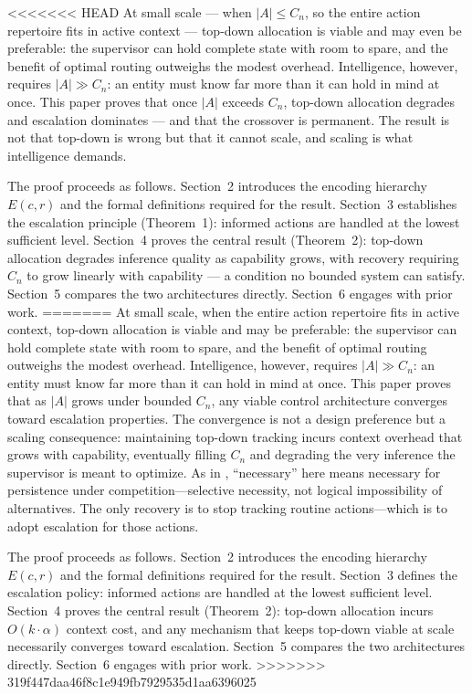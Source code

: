 \documentclass[11pt]{article}
\theoremstyle{definition}
\begin{document}
<<<<<<< HEAD
At small scale --- when $|A| \leq C_n$, so the entire action repertoire
fits in active context --- top-down allocation is viable and may even be
preferable: the supervisor can hold complete state with room to spare,
and the benefit of optimal routing outweighs the modest overhead.
Intelligence, however, requires $|A| \gg C_n$: an entity must know far
more than it can hold in mind at once. This paper proves that once
$|A|$ exceeds $C_n$, top-down allocation degrades and escalation
dominates --- and that the crossover is permanent. The result is not
that top-down is wrong but that it cannot scale, and scaling is what
intelligence demands.

The proof proceeds as follows. Section~2 introduces the encoding
hierarchy $E(c,r)$ and the formal definitions required for the result.
Section~3 establishes the escalation principle (Theorem~1): informed
actions are handled at the lowest sufficient level. Section~4 proves
the central result (Theorem~2): top-down allocation degrades inference
quality as capability grows, with recovery requiring $C_n$ to grow
linearly with capability --- a condition no bounded system can satisfy.
Section~5 compares the two architectures directly. Section~6 engages
with prior work.
=======
At small scale, when the entire action repertoire fits in active
context, top-down allocation is viable and may be preferable: the
supervisor can hold complete state with room to spare, and the benefit
of optimal routing outweighs the modest overhead. Intelligence,
however, requires $|A| \gg C_n$: an entity must know far more than it
can hold in mind at once. This paper proves that as $|A|$ grows under
bounded $C_n$, any viable control architecture converges toward
escalation properties. The convergence is not a design preference but
a scaling consequence: maintaining top-down tracking incurs context
overhead that grows with capability, eventually filling $C_n$ and
degrading the very inference the supervisor is meant to optimize.
As in \cite{McCarthy2026a}, ``necessary'' here means necessary for
persistence under competition---selective necessity, not logical
impossibility of alternatives. The
only recovery is to stop tracking routine actions---which is to adopt
escalation for those actions.

The proof proceeds as follows. Section~2 introduces the encoding
hierarchy $E(c,r)$ and the formal definitions required for the result.
Section~3 defines the escalation policy: informed
actions are handled at the lowest sufficient level. Section~4 proves
the central result (Theorem~2): top-down allocation incurs $O(k
\cdot \alpha)$ context cost, and any mechanism that keeps top-down
viable at scale necessarily converges toward escalation. Section~5
compares the two architectures directly. Section~6 engages with prior
work.
>>>>>>> 319f447daa46f8c1e949fb7929535d1aa6396025
\end{document}
